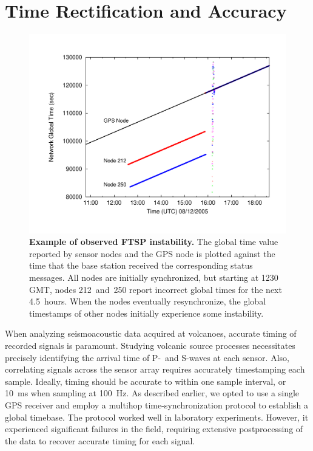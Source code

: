 \section{Time Rectification and Accuracy}
\label{evaluation-sec-timing}

\begin{figure}[t!]
\begin{center}
\includegraphics[width=\hsize]{./5-evaluation/figs/timing/MDW/instability/FTSPINSTABILITY.pdf}
\end{center} 
\caption{\textbf{Example of observed FTSP instability.}
The global time value reported by sensor nodes and the GPS node is plotted
against the time that the base station received the corresponding status
messages. All nodes are initially synchronized, but starting at 1230 GMT,
nodes 212~and~250 report incorrect global times for the next 4.5~hours. When
the nodes eventually resynchronize, the global timestamps of other nodes
initially experience some instability.}
\label{evaluation-fig-globaltimeproblem}
\end{figure}

When analyzing seismoacoustic data acquired at volcanoes, accurate timing of
recorded signals is paramount. Studying volcanic source processes
necessitates precisely identifying the arrival time of P-~and S-waves at each
sensor. Also, correlating signals across the sensor array requires accurately
timestamping each sample.  Ideally, timing should be accurate to within one
sample interval, or 10~ms when sampling at 100~Hz.  As described earlier, 
we opted to use a single GPS receiver and employ a multihop
time-synchronization protocol to establish a global timebase. The protocol
worked well in laboratory experiments. However, it experienced significant
failures in the field, requiring extensive postprocessing of the data to
recover accurate timing for each signal.


